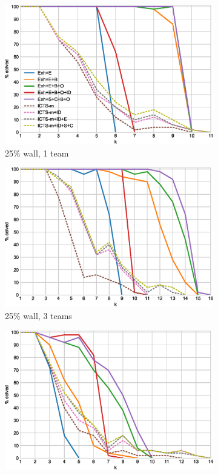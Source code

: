 \documentclass[english,10pt]{article}
\begin{document}
	\begin{figure}[t]
		\centering
		\begin{subfigure}{0.44\textwidth}
			\centering
			\includegraphics[width=\linewidth]{img/results/icts-comparison/25-1-p}
			\caption{25\% wall, 1 team}
			\label{fig:i-25-1-p}
		\end{subfigure}
		\begin{subfigure}{0.44\textwidth}
			\centering
			\includegraphics[width=\linewidth]{img/results/icts-comparison/25-3-p}
			\caption{25\% wall, 3 teams}
			\label{fig:i-25-3-p}
		\end{subfigure}
		\begin{subfigure}{0.44\textwidth}
			\centering
			\includegraphics[width=\linewidth]{img/results/icts-comparison/75-1-p}

\end{subfigure}
\end{figure}
\end{document}

